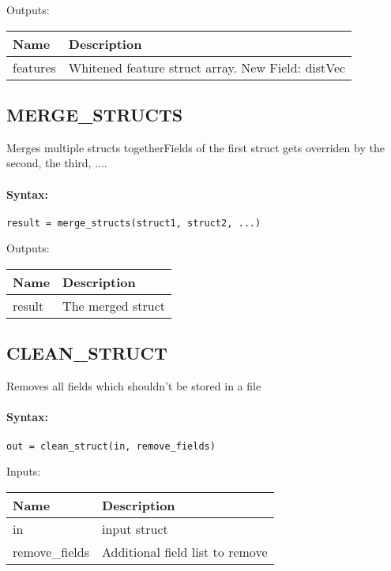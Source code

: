 \bigskip
Outputs:

\begin{tabular}{|p{}|p{}|}
\hline
\textbf{Name} & \textbf{Description} \\
\hline \hline
features & Whitened feature struct array. New Field: distVec  \\ \hline
\end{tabular}

\subsection{MERGE\_STRUCTS}

Merges multiple structs togetherFields of the first struct gets overriden by the second, the third, ....

\paragraph{Syntax:} \verb|result = merge_structs(struct1, struct2, ...)|

\bigskip
Outputs:

\begin{tabular}{|p{}|p{}|}
\hline
\textbf{Name} & \textbf{Description} \\
\hline \hline
result & The merged struct  \\ \hline
\end{tabular}

\subsection{CLEAN\_STRUCT}

Removes all fields which shouldn't be stored in a file

\paragraph{Syntax:} \verb|out = clean_struct(in, remove_fields)|

\bigskip
Inputs:

\begin{tabular}{|p{}|p{}|}
\hline
\textbf{Name} & \textbf{Description} \\
\hline \hline
in & input struct  \\ \hline
remove\_fields & Additional field list to remove  \\ \hline
\end{tabular}

